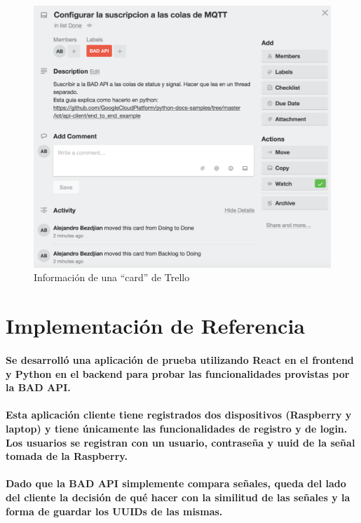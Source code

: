 \documentclass{article}
\begin{document}
\begin{figure}[ht]
    \centering
    \includegraphics[width=\textwidth]{trellocard.png}%
    \caption{Información de una “card” de Trello}
\end{figure}

\section{Implementación de Referencia}
\paragraph{
Se desarrolló una aplicación de prueba utilizando React en el frontend y Python en el backend para probar las funcionalidades provistas por la BAD API.
}
\paragraph{
Esta aplicación cliente tiene registrados dos dispositivos (Raspberry y laptop) y tiene únicamente las funcionalidades de registro y de login. Los usuarios se registran con un usuario, contraseña y uuid de la señal tomada de la Raspberry.
}
\paragraph{
Dado que la BAD API simplemente compara señales, queda del lado del cliente la decisión de qué hacer con la similitud de las señales y la forma de guardar los UUIDs de las mismas.
}
\end{document}

